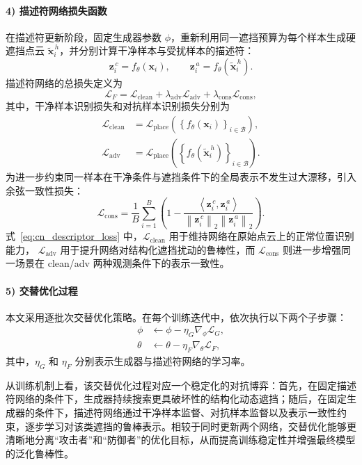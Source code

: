 \paragraph{4) 描述符网络损失函数}
在描述符更新阶段，固定生成器参数 $\phi$，重新利用同一遮挡预算为每个样本生成硬遮挡点云 $\tilde{\mathbf{x}}^{\,h}_i$，并分别计算干净样本与受扰样本的描述符：
\begin{equation}
\mathbf{z}^{\,c}_i=f_{\theta}(\mathbf{x}_i), \qquad
\mathbf{z}^{\,a}_i=f_{\theta}(\tilde{\mathbf{x}}^{\,h}_i).
\label{eq:cn_clean_adv_embedding}
\end{equation}
描述符网络的总损失定义为
\begin{equation}
\mathcal{L}_{F}
=
\mathcal{L}_{\mathrm{clean}}
+
\lambda_{\mathrm{adv}}\mathcal{L}_{\mathrm{adv}}
+
\lambda_{\mathrm{cons}}\mathcal{L}_{\mathrm{cons}},
\label{eq:cn_descriptor_loss}
\end{equation}
其中，干净样本识别损失和对抗样本识别损失分别为
\begin{align}
\mathcal{L}_{\mathrm{clean}}
&=
\mathcal{L}_{\mathrm{place}}
\left(
\left\{
f_{\theta}(\mathbf{x}_i)
\right\}_{i \in \mathcal{B}}
\right),
\label{eq:cn_clean_loss}
\\
\mathcal{L}_{\mathrm{adv}}
&=
\mathcal{L}_{\mathrm{place}}
\left(
\left\{
f_{\theta}\!\left(\tilde{\mathbf{x}}^{\,h}_i\right)
\right\}_{i \in \mathcal{B}}
\right).
\label{eq:cn_adv_loss}
\end{align}
为进一步约束同一样本在干净条件与遮挡条件下的全局表示不发生过大漂移，引入余弦一致性损失：
\begin{equation}
\mathcal{L}_{\mathrm{cons}}
=
\frac{1}{B}
\sum_{i=1}^{B}
\left(
1-
\frac{
\left\langle \mathbf{z}^{\,c}_i,\mathbf{z}^{\,a}_i \right\rangle
}{
\left\lVert \mathbf{z}^{\,c}_i \right\rVert_2
\left\lVert \mathbf{z}^{\,a}_i \right\rVert_2
}
\right).
\label{eq:cn_consistency_loss}
\end{equation}
式~\eqref{eq:cn_descriptor_loss} 中，$\mathcal{L}_{\mathrm{clean}}$ 用于维持网络在原始点云上的正常位置识别能力，
$\mathcal{L}_{\mathrm{adv}}$ 用于提升网络对结构化遮挡扰动的鲁棒性，而 $\mathcal{L}_{\mathrm{cons}}$ 则进一步增强同一场景在 clean/adv 两种观测条件下的表示一致性。

\paragraph{5) 交替优化过程}
本文采用逐批次交替优化策略。在每个训练迭代中，依次执行以下两个子步骤：
\begin{align}
\phi &\leftarrow \phi - \eta_{G} \nabla_{\phi}\mathcal{L}_{G},
\label{eq:cn_update_generator}
\\
\theta &\leftarrow \theta - \eta_{F} \nabla_{\theta}\mathcal{L}_{F},
\label{eq:cn_update_descriptor}
\end{align}
其中，$\eta_{G}$ 和 $\eta_{F}$ 分别表示生成器与描述符网络的学习率。

从训练机制上看，该交替优化过程对应一个稳定化的对抗博弈：首先，在固定描述符网络的条件下，生成器持续搜索更具破坏性的结构化动态遮挡；随后，在固定生成器的条件下，描述符网络通过干净样本监督、对抗样本监督以及表示一致性约束，逐步学习对该类遮挡的鲁棒表示。相较于同时更新两个网络，交替优化能够更清晰地分离“攻击者”和“防御者”的优化目标，从而提高训练稳定性并增强最终模型的泛化鲁棒性。
